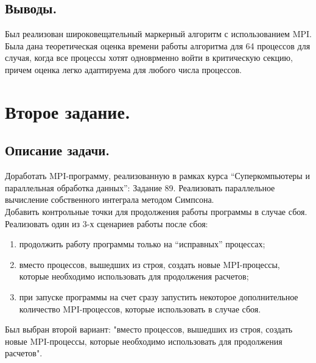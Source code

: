 \documentclass{article}
\begin{document}
\subsection{Выводы.}
Был реализован широковещательный маркерный алгоритм с использованием MPI. Была дана теоретическая оценка времени работы алгоритма для 64 процессов для случая, когда все процессы хотят одноврменно войти в критическую секцию, причем оценка легко адаптируема для любого числа процессов.

\section{Второе задание.}

\subsection{Описание задачи.}
Доработать MPI-программу, реализованную в рамках курса “Суперкомпьютеры и параллельная обработка данных”:
Задание 89. Реализовать параллельное вычисление собственного интеграла методом Симпсона.\\
Добавить контрольные точки для продолжения работы программы в случае сбоя. Реализовать один из 3-х сценариев работы после сбоя: 
\begin{enumerate}
    \item продолжить работу программы только на “исправных” процессах;
    \item вместо процессов, вышедших из строя, создать новые MPI-процессы, которые необходимо использовать для продолжения расчетов;
    \item при запуске программы на счет сразу запустить некоторое дополнительное количество MPI-процессов, которые использовать в случае сбоя.
\end{enumerate}
Был выбран второй вариант: "вместо процессов, вышедших из строя, создать новые MPI-процессы, которые необходимо использовать для продолжения расчетов".
\end{document}
